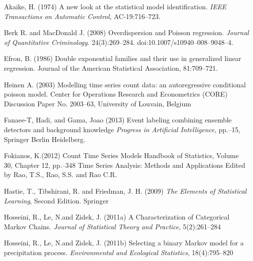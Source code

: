 \documentclass[11pt,twoside,openany]{article}
\begin{document}
\begin{thebibliography}{99}

Akaike, H. (1974)
\newblock A new look at the statistical model identification.
\newblock \emph{IEEE Transactions on Automatic Control}, AC-19:716--723.

Berk R. and MacDonald J. (2008)
\newblock Overdispersion and Poisson regression.
\newblock \emph{Journal of Quantitative Criminology}. 24(3):269--284. doi:10.1007/s10940--008--9048--4.

Efron, B. (1986)
\newblock Double exponential families and their use in generalized linear regression.
\newblock Journal of the American Statistical Association, 81:709--721.

Heinen A. (2003)
\newblock Modelling time series count data: an autoregressive conditional poisson model.
\newblock Center for Operations Research and Econometrics (CORE) Discussion Paper No. 2003--63,
University of Louvain, Belgium


Fanaee-T, Hadi, and Gama, Joao (2013)
\newblock Event labeling combining ensemble detectors and background knowledge
\newblock \emph{Progress in Artificial Intelligence}, pp.--15, Springer Berlin Heidelberg.

Fokianos, K.\;(2012)
\newblock Count Time Series Models
\newblock Handbook of Statistics, Volume 30, Chapter 12, pp.--348
Time Series Analysis: Methods and Applications Edited by Rao, T.\;S., Rao, S.\;S. and Rao C.R.

Hastie, T., Tibshirani, R. and Friedman, J. H. (2009)
\newblock \emph{The Elements of Statistical Learning}, Second Edition.
\newblock Springer

Hosseini, R., Le, N.\;and Zidek, J. (2011a)
\newblock A Characterization of Categorical Markov Chains.
\newblock \emph{Journal of Statistical Theory and Practice}, 5(2):261--284

Hosseini, R., Le, N.\;and Zidek, J. (2011b)
\newblock Selecting a binary Markov model for a precipitation process.
\newblock \emph{Environmental and Ecological Statistics}, 18(4):795--820


\end{thebibliography}
\end{document}
